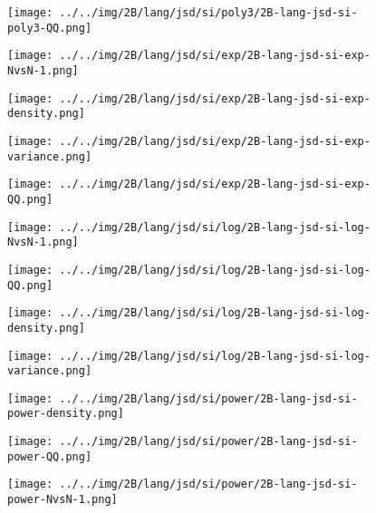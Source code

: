 \begin{figure}[H]
\centering	\texttt{[image: ../../img/2B/lang/jsd/si/poly3/2B-lang-jsd-si-poly3-QQ.png]}
\end{figure}
\begin{figure}[H]
\centering	\texttt{[image: ../../img/2B/lang/jsd/si/exp/2B-lang-jsd-si-exp-NvsN-1.png]}
\end{figure}
\begin{figure}[H]
\centering	\texttt{[image: ../../img/2B/lang/jsd/si/exp/2B-lang-jsd-si-exp-density.png]}
\end{figure}
\begin{figure}[H]
\centering	\texttt{[image: ../../img/2B/lang/jsd/si/exp/2B-lang-jsd-si-exp-variance.png]}
\end{figure}
\begin{figure}[H]
\centering	\texttt{[image: ../../img/2B/lang/jsd/si/exp/2B-lang-jsd-si-exp-QQ.png]}
\end{figure}
\begin{figure}[H]
\centering	\texttt{[image: ../../img/2B/lang/jsd/si/log/2B-lang-jsd-si-log-NvsN-1.png]}
\end{figure}
\begin{figure}[H]
\centering	\texttt{[image: ../../img/2B/lang/jsd/si/log/2B-lang-jsd-si-log-QQ.png]}
\end{figure}
\begin{figure}[H]
\centering	\texttt{[image: ../../img/2B/lang/jsd/si/log/2B-lang-jsd-si-log-density.png]}
\end{figure}
\begin{figure}[H]
\centering	\texttt{[image: ../../img/2B/lang/jsd/si/log/2B-lang-jsd-si-log-variance.png]}
\end{figure}
\begin{figure}[H]
\centering	\texttt{[image: ../../img/2B/lang/jsd/si/power/2B-lang-jsd-si-power-density.png]}
\end{figure}
\begin{figure}[H]
\centering	\texttt{[image: ../../img/2B/lang/jsd/si/power/2B-lang-jsd-si-power-QQ.png]}
\end{figure}
\begin{figure}[H]
\centering	\texttt{[image: ../../img/2B/lang/jsd/si/power/2B-lang-jsd-si-power-NvsN-1.png]}
\end{figure}
